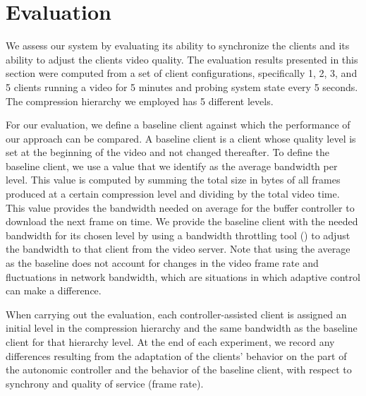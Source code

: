 \documentclass{sig-alternate}
\begin{document}

\section{Evaluation} \label{eval}

We assess our system by evaluating its ability to synchronize the
clients and its ability to adjust the clients video quality.  The
evaluation results presented in this section were computed from a set
of client configurations, specifically 1, 2, 3, and 5 clients running
a video for 5 minutes and probing system state every 5 seconds. The
compression hierarchy we employed has 5 different levels.

For our evaluation, we define a baseline client against which the
performance of our approach can be compared.  A baseline client is a
client whose quality level is set at the beginning of the video and
not changed thereafter.  To define the baseline client, we use a value
that we identify as the average bandwidth per level. This value is
computed by summing the total size in bytes of all frames produced at
a certain compression level and dividing by the total video time.
This value provides the bandwidth needed on average for the buffer
controller to download the next frame on time.  We provide the
baseline client with the needed bandwidth for its chosen level by
using a bandwidth throttling tool (\cite{SHAPERD}) to adjust the
bandwidth to that client from the video server.  Note that using the
average as the baseline does not account for changes in the video
frame rate and fluctuations in network bandwidth, which are situations
in which adaptive control can make a difference.

When carrying out the evaluation, each controller-assisted client is
assigned an initial level in the compression hierarchy and the same
bandwidth as the baseline client for that hierarchy level.  At the end
of each experiment, we record any differences resulting from the
adaptation of the clients' behavior on the part of the autonomic
controller and the behavior of the baseline client, with respect to
synchrony and quality of service (frame rate).

 
\end{document}

